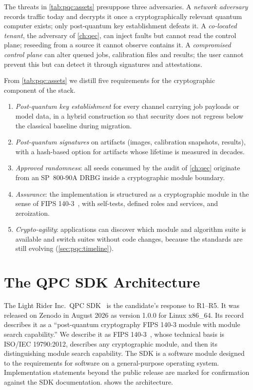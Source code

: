 The threats in \cref{tab:pqc:assets} presuppose three adversaries. A \emph{network adversary} records traffic today and decrypts it once a cryptographically relevant quantum computer exists; only post-quantum key establishment defeats it. A \emph{co-located tenant}, the adversary of \cref{ch:qec}, can inject faults but cannot read the control plane; reseeding from a source it cannot observe contains it. A \emph{compromised control plane} can alter queued jobs, calibration files and results; the user cannot prevent this but can detect it through signatures and attestations.

From \cref{tab:pqc:assets} we distill five requirements for the cryptographic component of the stack.
\begin{enumerate}
\item[R1] \emph{Post-quantum key establishment} for every channel carrying job payloads or model data, in a hybrid construction so that security does not regress below the classical baseline during migration.
\item[R2] \emph{Post-quantum signatures} on artifacts (images, calibration snapshots, results), with a hash-based option for artifacts whose lifetime is measured in decades.
\item[R3] \emph{Approved randomness}: all seeds consumed by the audit of \cref{ch:qec} originate from an SP~800-90A DRBG inside a cryptographic module boundary.
\item[R4] \emph{Assurance}: the implementation is structured as a cryptographic module in the sense of FIPS 140-3~\cite{nist2019fips1403}, with self-tests, defined roles and services, and zeroization.
\item[R5] \emph{Crypto-agility}: applications can discover which module and algorithm suite is available and switch suites without code changes, because the standards are still evolving (\cref{sec:pqc:timeline}).
\end{enumerate}

\section{The QPC SDK Architecture}\label{sec:pqc:sdk}

The Light Rider Inc.\ QPC SDK~\cite{guo2026lightriderqpc} is the candidate's response to R1--R5. It was released on Zenodo in August 2026 as version 1.0.0 for Linux x86\_64. Its record describes it as a ``post-quantum cryptography FIPS 140-3 module with module search capability.'' We describe it as FIPS 140-3~\cite{nist2019fips1403}, whose technical basis is ISO/IEC 19790:2012, describes any cryptographic module, and then its distinguishing module search capability. The SDK is a software module designed to the requirements for software on a general-purpose operating system. Implementation statements beyond the public release are marked for confirmation against the SDK documentation.  shows the architecture.

